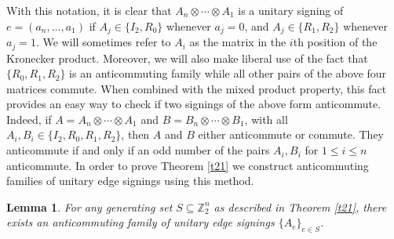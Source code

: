 \documentclass[11pt]{article}
\newtheorem{lemma}[theo]{Lemma}
\begin{document}
With this notation, it is clear that 
$A_n \otimes \cdots \otimes A_1$ is a unitary signing 
of $e = (a_n, \ldots, a_1)$ if $A_j \in \{I_2, R_0 \}$ whenever $a_j = 0$, 
and $A_j \in \{R_1, R_2 \}$ whenever $a_j = 1$. 
We will sometimes refer to $A_i$ as the matrix in the $i$th position 
of the Kronecker product. Moreover, we will also make liberal use of 
the fact that $\{ R_0, R_1, R_2 \}$ is an anticommuting family while 
all other pairs of the above four matrices commute. 
When combined with the mixed product property, this fact provides 
an easy way to check if two signings of the above form anticommute. 
Indeed, if $A = A_n \otimes \cdots \otimes A_1$ and 
$B = B_n \otimes \cdots \otimes B_1$, with all 
$A_i, B_i \in \{I_2, R_0, R_1, R_2 \}$, then $A$ and $B$ 
either anticommute or commute. They anticommute if and only if 
an odd number of the pairs $A_i, B_i$  for $1 \leq i \leq n$
anticommute. 
In order to prove Theorem \ref{t21} we
construct anticommuting families of unitary edge signings using this method.
\begin{lemma}
\label{lm: AC}
For any generating set $S \subseteq \mathbb{Z}_{2}^{n}$ 
as described in Theorem \ref{t21}, there exists an anticommuting 
family of unitary edge signings $\{A_e\}_{e \in S}$.
\end{lemma}
\end{document}
